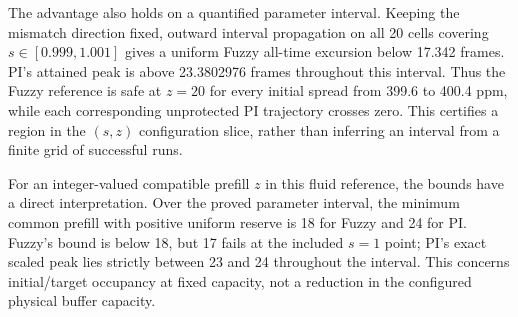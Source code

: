 The advantage also holds on a quantified parameter interval. Keeping
the mismatch direction fixed, outward interval propagation on all
20 cells covering $s\in[0.999,1.001]$ gives a uniform Fuzzy
all-time excursion below 17.342 frames. PI's attained peak is above
23.3802976 frames throughout this interval. Thus the Fuzzy reference
is safe at $z=20$ for every initial spread from 399.6 to 400.4 ppm,
while each corresponding unprotected PI trajectory crosses zero.
This certifies a region in the $(s,z)$ configuration slice, rather
than inferring an interval from a finite grid of successful runs.



For an integer-valued compatible prefill $z$ in this fluid reference,
the bounds have a direct interpretation. Over the proved parameter
interval, the minimum common prefill with positive uniform reserve
is 18 for Fuzzy and 24 for PI. Fuzzy's bound is below 18, but 17
fails at the included $s=1$ point; PI's exact scaled peak lies
strictly between 23 and 24 throughout the interval. This concerns
initial/target occupancy at fixed capacity, not a reduction in the
configured physical buffer capacity.
